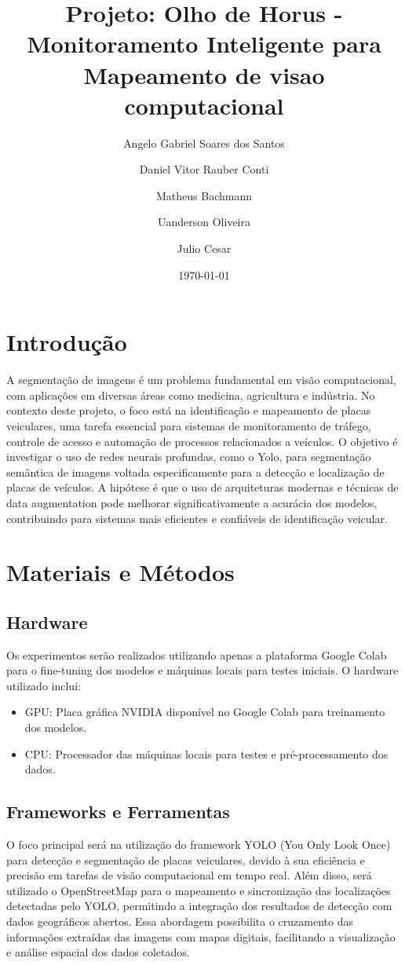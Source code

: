 \documentclass[a4paper,12pt]{article}
\title{Projeto: Olho de Horus - Monitoramento Inteligente para Mapeamento de visao computacional}
\author{
    Angelo Gabriel Soares dos Santos \and
    Daniel Vitor Rauber Conti \and
    Matheus Bachmann \and
    Uanderson Oliveira \and Julio Cesar
}
\date{\today}
\begin{document}
\maketitle

\section{Introdução}
A segmentação de imagens é um problema fundamental em visão computacional, com aplicações em diversas áreas como medicina, agricultura e indústria. No contexto deste projeto, o foco está na identificação e mapeamento de placas veiculares, uma tarefa essencial para sistemas de monitoramento de tráfego, controle de acesso e automação de processos relacionados a veículos. O objetivo é investigar o uso de redes neurais profundas, como o Yolo, para segmentação semântica de imagens voltada especificamente para a detecção e localização de placas de veículos. A hipótese é que o uso de arquiteturas modernas e técnicas de data augmentation pode melhorar significativamente a acurácia dos modelos, contribuindo para sistemas mais eficientes e confiáveis de identificação veicular.

\section{Materiais e Métodos}

\subsection{Hardware}
Os experimentos serão realizados utilizando apenas a plataforma Google Colab para o fine-tuning dos modelos e máquinas locais para testes iniciais. O hardware utilizado inclui:
\begin{itemize}
    \item GPU: Placa gráfica NVIDIA disponível no Google Colab para treinamento dos modelos.
    \item CPU: Processador das máquinas locais para testes e pré-processamento dos dados.
\end{itemize}
\subsection{Frameworks e Ferramentas}
O foco principal será na utilização do framework YOLO (You Only Look Once) para detecção e segmentação de placas veiculares, devido à sua eficiência e precisão em tarefas de visão computacional em tempo real. Além disso, será utilizado o OpenStreetMap para o mapeamento e sincronização das localizações detectadas pelo YOLO, permitindo a integração dos resultados de detecção com dados geográficos abertos. Essa abordagem possibilita o cruzamento das informações extraídas das imagens com mapas digitais, facilitando a visualização e análise espacial dos dados coletados.
\end{document}
